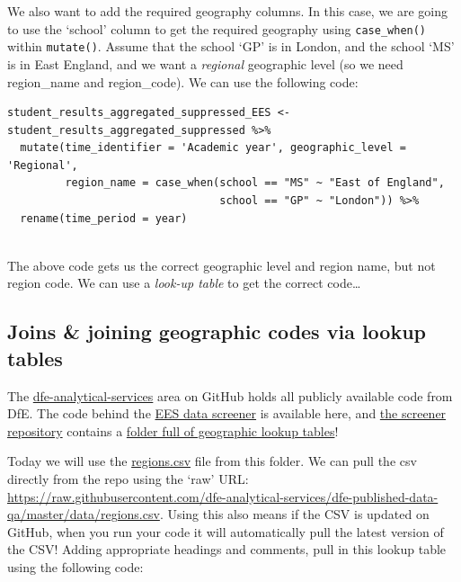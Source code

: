 \documentclass[
  12pt,
]{article}
\begin{document}
We also want to add the required geography columns. In this case, we are
going to use the `school' column to get the required geography using
\texttt{case\_when()} within \texttt{mutate()}. Assume that the school
`GP' is in London, and the school `MS' is in East England, and we want a
\emph{regional} geographic level (so we need region\_name and
region\_code). We can use the following code:

\begin{verbatim}
student_results_aggregated_suppressed_EES <- student_results_aggregated_suppressed %>%
  mutate(time_identifier = 'Academic year', geographic_level = 'Regional',
         region_name = case_when(school == "MS" ~ "East of England",
                                 school == "GP" ~ "London")) %>%
  rename(time_period = year)
  
\end{verbatim}

The above code gets us the correct geographic level and region name, but
not region code. We can use a \emph{look-up table} to get the correct
code\ldots{}

\hypertarget{joins-joining-geographic-codes-via-lookup-tables}{%
\subsection{Joins \& joining geographic codes via lookup
tables}\label{joins-joining-geographic-codes-via-lookup-tables}}

The
\href{https://github.com/dfe-analytical-services}{dfe-analytical-services}
area on GitHub holds all publicly available code from DfE. The code
behind the \href{https://rsconnect/rsc/dfe-published-data-qa/}{EES data
screener} is available here, and
\href{https://github.com/dfe-analytical-services/dfe-published-data-qa}{the
screener repository} contains a
\href{https://github.com/dfe-analytical-services/dfe-published-data-qa/tree/master/data}{folder
full of geographic lookup tables}!

Today we will use the
\href{https://github.com/dfe-analytical-services/dfe-published-data-qa/blob/master/data/regions.csv}{regions.csv}
file from this folder. We can pull the csv directly from the repo using
the `raw' URL:
\url{https://raw.githubusercontent.com/dfe-analytical-services/dfe-published-data-qa/master/data/regions.csv}.
Using this also means if the CSV is updated on GitHub, when you run your
code it will automatically pull the latest version of the CSV! Adding
appropriate headings and comments, pull in this lookup table using the
following code:
\end{document}
